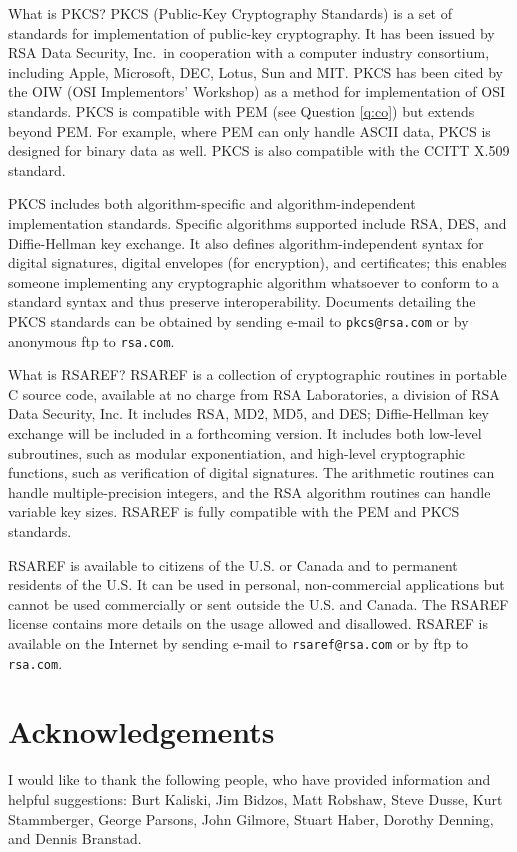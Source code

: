 {What is PKCS?}
PKCS (Public-Key Cryptography Standards) is a set of standards for 
implementation of public-key cryptography. It has been issued by RSA 
Data Security, Inc.\ in cooperation with a computer industry consortium, 
including Apple, Microsoft, DEC, Lotus, Sun and MIT. PKCS has been cited 
by the OIW (OSI Implementors' Workshop) as a method for implementation of 
OSI standards. PKCS is compatible with PEM (see Question \ref{q:co}) but 
extends beyond PEM. For example, where PEM can only handle ASCII data, PKCS 
is designed for binary data as well. PKCS is also compatible with the CCITT 
X.509 standard.

PKCS includes both algorithm-specific and algorithm-independent 
implementation standards. Specific algorithms supported include RSA, DES, 
and Diffie-Hellman key exchange. It also defines algorithm-independent syntax 
for digital signatures, digital envelopes (for encryption), and certificates; 
this enables someone implementing any cryptographic algorithm whatsoever to 
conform to a standard syntax and thus preserve interoperability. Documents 
detailing the PKCS standards can be obtained by sending e-mail to 
\verb+pkcs@rsa.com+ or by anonymous ftp to \verb+rsa.com+.

{What is RSAREF?}
RSAREF is a collection of cryptographic routines in portable C source code,
available at no charge from RSA Laboratories, a division of RSA Data Security,
Inc. It includes RSA, MD2, MD5, and DES; Diffie-Hellman key exchange will 
be included in a forthcoming version. It includes both low-level 
subroutines, such as modular exponentiation, and high-level cryptographic 
functions, such as verification of digital signatures. The arithmetic routines 
can handle multiple-precision integers, and the RSA algorithm routines can 
handle variable key sizes. RSAREF is fully compatible with the PEM and PKCS
standards.

RSAREF is available to citizens of the U.S. or Canada and to permanent 
residents of the U.S. It can be used in personal, non-commercial applications 
but cannot be used commercially or sent outside the U.S. and Canada. The 
RSAREF license contains more details on the usage allowed and disallowed. 
RSAREF is available on the Internet by sending e-mail to 
\verb+rsaref@rsa.com+ or by ftp to \verb+rsa.com+.

\section{Acknowledgements}
I would like to thank the following people, who have provided information 
and helpful suggestions: Burt Kaliski, Jim Bidzos, Matt Robshaw, Steve Dusse, 
Kurt Stammberger, George Parsons, John Gilmore, Stuart Haber, Dorothy 
Denning, and Dennis Branstad. 


